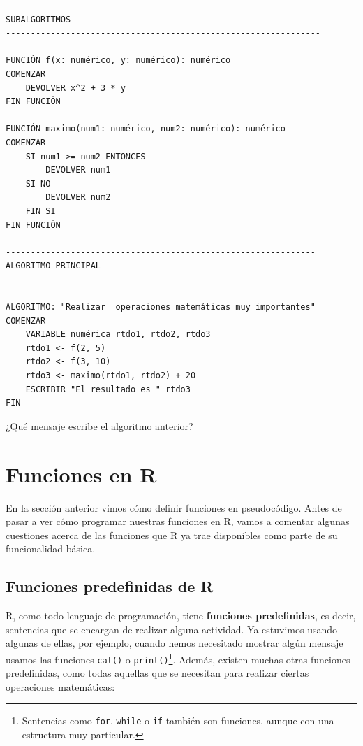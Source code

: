 \documentclass[
]{book}
\begin{document}
\begin{verbatim}
---------------------------------------------------------------
SUBALGORITMOS
---------------------------------------------------------------

FUNCIÓN f(x: numérico, y: numérico): numérico
COMENZAR
    DEVOLVER x^2 + 3 * y
FIN FUNCIÓN

FUNCIÓN maximo(num1: numérico, num2: numérico): numérico
COMENZAR
    SI num1 >= num2 ENTONCES
        DEVOLVER num1
    SI NO
        DEVOLVER num2
    FIN SI
FIN FUNCIÓN

--------------------------------------------------------------
ALGORITMO PRINCIPAL
--------------------------------------------------------------

ALGORITMO: "Realizar  operaciones matemáticas muy importantes"
COMENZAR
    VARIABLE numérica rtdo1, rtdo2, rtdo3
    rtdo1 <- f(2, 5)
    rtdo2 <- f(3, 10)
    rtdo3 <- maximo(rtdo1, rtdo2) + 20
    ESCRIBIR "El resultado es " rtdo3
FIN
\end{verbatim}

¿Qué mensaje escribe el algoritmo anterior?

\hypertarget{funciones-en-r}{%
\section{Funciones en R}\label{funciones-en-r}}

En la sección anterior vimos cómo definir funciones en pseudocódigo. Antes de pasar a ver cómo programar nuestras funciones en R, vamos a comentar algunas cuestiones acerca de las funciones que R ya trae disponibles como parte de su funcionalidad básica.

\hypertarget{funciones-predefinidas-de-r}{%
\subsection{Funciones predefinidas de R}\label{funciones-predefinidas-de-r}}

R, como todo lenguaje de programación, tiene \textbf{funciones predefinidas}, es decir, sentencias que se encargan de realizar alguna actividad. Ya estuvimos usando algunas de ellas, por ejemplo, cuando hemos necesitado mostrar algún mensaje usamos las funciones \texttt{cat()} o \texttt{print()}\footnote{Sentencias como \texttt{for}, \texttt{while} o \texttt{if} también son funciones, aunque con una estructura muy particular.}. Además, existen muchas otras funciones predefinidas, como todas aquellas que se necesitan para realizar ciertas operaciones matemáticas:
\end{document}
